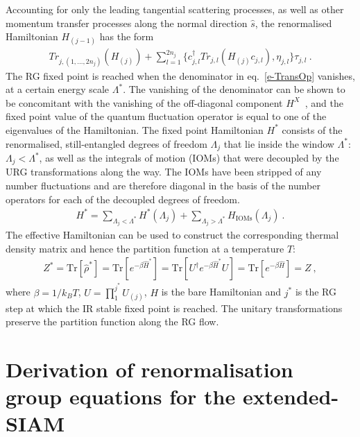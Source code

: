 \documentclass{iopart}
\begin{document}
Accounting for only the leading tangential scattering processes, as well as other momentum transfer processes along the normal direction $\hat{s}$, the renormalised Hamiltonian \(H_{(j-1)}\) has the form~\cite{anirbanurg1}
\begin{eqnarray}
Tr_{j,(1,\ldots,2n_{j})}(H_{(j)})+\sum_{l=1}^{2n_{j}}\lbrace c^{\dagger}_{j,l}Tr_{j,l}(H_{(j)}c_{j,l}),\eta_{j,l}\rbrace\tau_{j,l}~.\label{HRG}
\end{eqnarray}
The RG fixed point is reached when the denominator in eq.~\eqref{e-TransOp} vanishes, at a certain energy scale \(\Lambda^*\).
The vanishing of the denominator can be shown to be concomitant with the vanishing of the off-diagonal component \(H^X\)~\cite{anirbanurg1}, and the fixed point value of the quantum fluctuation operator is equal to one of the eigenvalues of the Hamiltonian.
The fixed point Hamiltonian \(H^*\) consists of the renormalised, still-entangled degrees of freedom \(\Lambda_j\) that lie inside the window \(\Lambda^*\): \(\Lambda_j < \Lambda^*\), as well as the integrals of motion (IOMs) that were decoupled by the URG transformations along the way.
The IOMs have been stripped of any number fluctuations and are therefore diagonal in the basis of the number operators for each of the decoupled degrees of freedom.
\begin{eqnarray}
	H^* = \sum_{\Lambda_j < \Lambda^*} H^*(\Lambda_j) + \sum_{\Lambda_j > \Lambda^*}H_\text{IOMs}(\Lambda_j)~.
\end{eqnarray}
The effective Hamiltonian can be used to construct the corresponding thermal density matrix and hence the partition function at a temperature \(T\):
\begin{eqnarray}
Z^* = \mathrm{Tr}\left[ \hat{\rho}^*\right] = \mathrm{Tr}\left[ e^{-\beta \hat{H}^{*}}\right] = \mathrm{Tr}\left[ U^{\dagger} e^{-\beta \hat{H}^{*}} U\right] = \mathrm{Tr}\left[ e^{-\beta \hat{H}}\right] = Z
\label{partfunc}~,
\end{eqnarray}
where \(\beta = 1/k_B T\), \(U = \prod_{1}^{j^{*}}U_{(j)}\), $H$ is the bare Hamiltonian and $j^{*}$ is the RG step at which the IR stable fixed point is reached. The unitary transformations preserve the partition function along the RG flow.

\section{Derivation of renormalisation group equations for the extended-SIAM}
\end{document}
